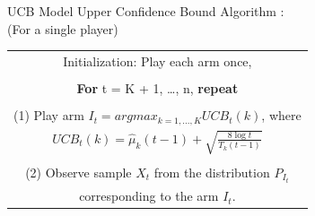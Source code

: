 \documentclass{IFES-beamer}
\begin{document}
        \begin{frame}{UCB Model}
        Upper Confidence Bound Algorithm :\\
        (For a single player)
            \begin{table}[H]
      			\centering
      			\begin{tabular}{ | c |}
        		\hline
        		\noindent Initialization: Play each arm once,\\\\
        		\noindent \textbf{For} t = K + 1, \dots , n, \textbf{repeat}\\\\
        		(1) Play arm $I_t = arg max_{k=1,...,K} UCB_t(k)$, where \\
        		$UCB_t(k) = \hat{\mu}_k(t-1) + \sqrt{\frac{8 \log t}{T_k (t-1)}}$\\\\
        		(2) Observe sample $X_t$ from the distribution $P_{I_{t}}$ \\
        		\noindent corresponding to the arm $I_t$.\\
        		\hline
			\end{tabular}
		\end{table}
        \end{frame}
        
\end{document}
